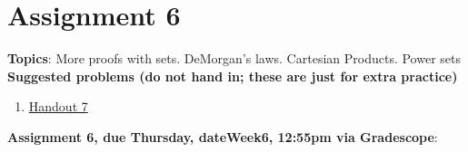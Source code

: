 \documentclass[12pt]{article}
\newcommand{\HWdueTime}{12:55pm }
\begin{document}
\newpage
\section[6 (due \csname dateWeek6\endcsname): More sets. DeMorgan's laws. Cartesian Products. Power sets.]{Assignment 6}

\noindent \textbf{Topics}: More proofs with sets. DeMorgan's laws. Cartesian Products. Power sets
\\




\noindent \textbf{Suggested problems (do not hand in; these are just for extra practice)}
 
\begin{enumerate}


 \item \href{https://www.math.emory.edu/~dzb/teaching/250Fall2021/handouts/250-H07-sets-II.pdf}{Handout 7}
\end{enumerate}
\smallskip

\noindent \textbf{Assignment 6, due Thursday, \csname dateWeek6\endcsname, \HWdueTime via Gradescope}:
\end{document}
